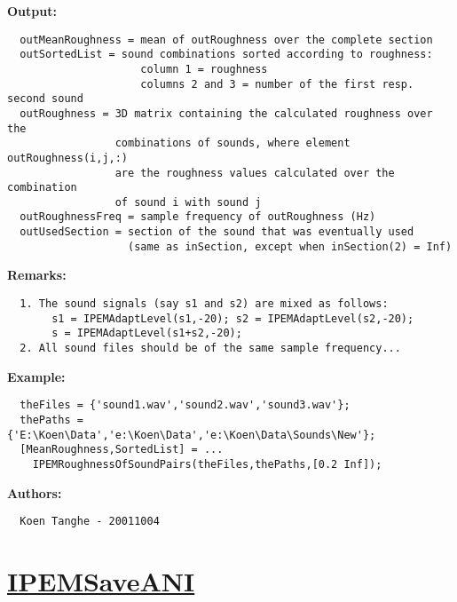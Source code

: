 \textbf{Output:}
\begin{verbatim}  outMeanRoughness = mean of outRoughness over the complete section
  outSortedList = sound combinations sorted according to roughness:
                     column 1 = roughness
                     columns 2 and 3 = number of the first resp. second sound
  outRoughness = 3D matrix containing the calculated roughness over the
                 combinations of sounds, where element outRoughness(i,j,:) 
                 are the roughness values calculated over the combination
                 of sound i with sound j
  outRoughnessFreq = sample frequency of outRoughness (Hz)
  outUsedSection = section of the sound that was eventually used
                   (same as inSection, except when inSection(2) = Inf)

\end{verbatim}
\textbf{Remarks:}
\begin{verbatim}  1. The sound signals (say s1 and s2) are mixed as follows:
       s1 = IPEMAdaptLevel(s1,-20); s2 = IPEMAdaptLevel(s2,-20);
       s = IPEMAdaptLevel(s1+s2,-20);
  2. All sound files should be of the same sample frequency...

\end{verbatim}
\textbf{Example:}
\begin{verbatim}  theFiles = {'sound1.wav','sound2.wav','sound3.wav'};
  thePaths = {'E:\Koen\Data','e:\Koen\Data','e:\Koen\Data\Sounds\New'};
  [MeanRoughness,SortedList] = ...
    IPEMRoughnessOfSoundPairs(theFiles,thePaths,[0.2 Inf]);

\end{verbatim}
\textbf{Authors:}
\begin{verbatim}  Koen Tanghe - 20011004
\end{verbatim}


\newpage
\section*{\hyperlink{Concepts:IPEMSaveANI}{IPEMSaveANI}}
\hypertarget{FuncRef:IPEMSaveANI}{}

